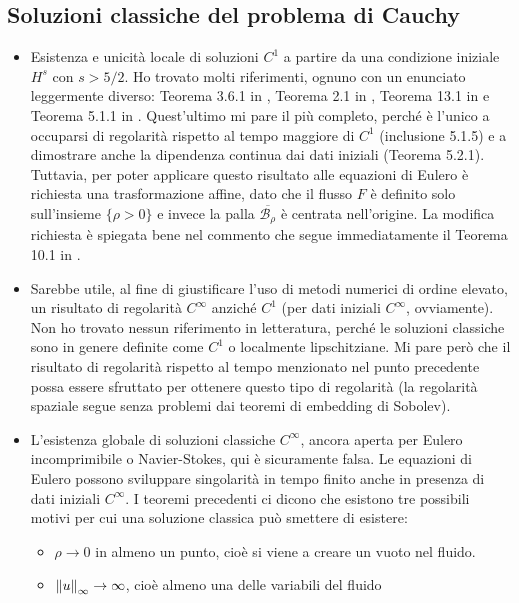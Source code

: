 \subsection*{Soluzioni classiche del problema di Cauchy}

\begin{itemize}
\item Esistenza e unicità locale di soluzioni $C^1$ a partire da
	una condizione iniziale $H^s$ con $s > 5/2$.
	Ho trovato molti riferimenti, ognuno con un enunciato leggermente
	diverso: Teorema 3.6.1 in \cite{serre},
	Teorema 2.1 in \cite{chen-wang},
	Teorema 13.1 in \cite{benzoni-gavage-serre} e
	Teorema 5.1.1 in \cite{dafermos}.
	Quest'ultimo mi pare il più completo, perché è l'unico a occuparsi
	di regolarità rispetto al tempo maggiore di $C^1$ (inclusione 5.1.5)
	e a dimostrare anche la dipendenza continua dai dati iniziali
	(Teorema 5.2.1). Tuttavia, per poter applicare questo risultato
	alle equazioni di Eulero è richiesta una trasformazione affine,
	dato che il flusso $F$ è definito solo sull'insieme $\{\rho > 0\}$
	e invece la palla $\overline{\mathscr{B}_\rho}$ è centrata nell'origine.
	La modifica richiesta è spiegata bene nel commento che segue immediatamente
	il Teorema 10.1 in \cite{benzoni-gavage-serre}.
\item Sarebbe utile, al fine di giustificare l'uso di metodi numerici
	di ordine elevato, un risultato di regolarità $C^\infty$
	anziché $C^1$ (per dati iniziali $C^\infty$, ovviamente).
	Non ho trovato nessun riferimento in letteratura,
	perché le soluzioni classiche sono in genere definite come
	$C^1$ o localmente lipschitziane.
	Mi pare però che il risultato di regolarità rispetto al
	tempo menzionato nel punto precedente possa essere sfruttato
	per ottenere questo tipo di regolarità (la regolarità spaziale segue
	senza problemi dai teoremi di embedding di Sobolev).
\item L'esistenza globale di soluzioni classiche $C^\infty$, ancora aperta
	per Eulero incomprimibile o Navier-Stokes, qui è sicuramente falsa.
	Le equazioni di Eulero possono sviluppare singolarità in tempo finito
	anche in presenza di dati iniziali $C^\infty$.
	I teoremi precedenti ci dicono che esistono tre possibili motivi
	per cui una soluzione classica può smettere di esistere:
	\begin{itemize}
	\item $\rho \to 0$ in almeno un punto, cioè si viene a creare un vuoto nel fluido.
	\item $\left\lVert u\right\rVert_\infty \to \infty$, cioè almeno una delle variabili del fluido

\end{itemize}
\end{itemize}
